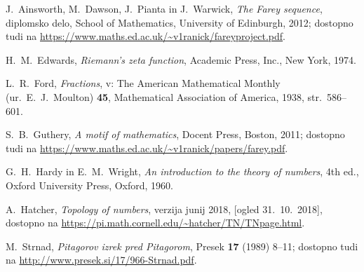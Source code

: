 \documentclass[mat1]{fmfdelo}
\begin{document}
\begin{thebibliography}{99}

 J.~Ainsworth, M.~Dawson, J.~Pianta in J.~Warwick, \emph{The Farey sequence}, diplomsko delo, School of Mathematics, University of Edinburgh, 2012; dostopno tudi na \url{https://www.maths.ed.ac.uk/~v1ranick/fareyproject.pdf}.

 H.~M.~Edwards, \emph{Riemann's zeta function}, Academic Press, Inc., New York, 1974.

 L.~R.~Ford, \emph{Fractions}, v: The American Mathematical Monthly (ur.\ E.~J.~Moulton) \textbf{45}, Mathematical Association of America, 1938, str.\ 586--601.

 S.~B.~Guthery, \emph{A motif of mathematics}, Docent Press, Boston, 2011; dostopno tudi na \url{https://www.maths.ed.ac.uk/~v1ranick/papers/farey.pdf}.

 G.~H.~Hardy in E.~M.~Wright, \emph{An introduction to the theory of numbers}, 4th ed., Oxford University Press, Oxford, 1960.

 A.~Hatcher, \emph{Topology of numbers}, verzija junij 2018, [ogled 31.~10.~2018], dostopno na \url{https://pi.math.cornell.edu/~hatcher/TN/TNpage.html}.

 M.~Strnad, \emph{Pitagorov izrek pred Pitagorom}, Presek \textbf{17} (1989) 8--11; dostopno tudi na \url{http://www.presek.si/17/966-Strnad.pdf}.

\end{thebibliography}
\end{document}
